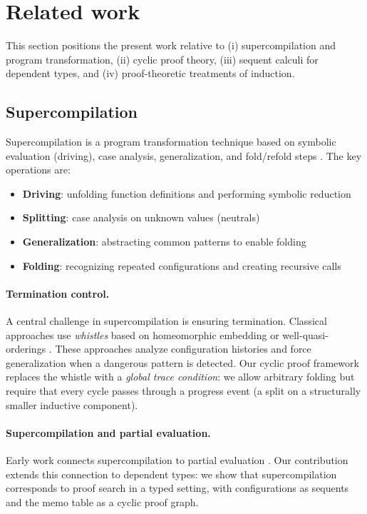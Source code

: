 \section{Related work}
\label{sec:related}

This section positions the present work relative to (i) supercompilation and program transformation, (ii) cyclic proof theory, (iii) sequent calculi for dependent types, and (iv) proof-theoretic treatments of induction.

\subsection{Supercompilation}

Supercompilation is a program transformation technique based on symbolic evaluation (driving), case analysis, generalization, and fold/refold steps \cite{turchin-1986-supercompiler,sorensen-gluck-1995-supercompilation}.
The key operations are:
\begin{itemize}
\item \textbf{Driving}: unfolding function definitions and performing symbolic reduction
\item \textbf{Splitting}: case analysis on unknown values (neutrals)
\item \textbf{Generalization}: abstracting common patterns to enable folding
\item \textbf{Folding}: recognizing repeated configurations and creating recursive calls
\end{itemize}

\paragraph{Termination control.}
A central challenge in supercompilation is ensuring termination. 
Classical approaches use \emph{whistles} based on homeomorphic embedding or well-quasi-orderings \cite{kruskal-1960-wqo,leuschel-2002-homeomorphic,sorensen-gluck-jones-1996-positive}.
These approaches analyze configuration histories and force generalization when a dangerous pattern is detected.
Our cyclic proof framework replaces the whistle with a \emph{global trace condition}: we allow arbitrary folding but require that every cycle passes through a progress event (a split on a structurally smaller inductive component).

\paragraph{Supercompilation and partial evaluation.}
Early work connects supercompilation to partial evaluation \cite{jonesbook-1996-partial-evaluation}.
Our contribution extends this connection to dependent types: we show that supercompilation corresponds to proof search in a typed setting, with configurations as sequents and the memo table as a cyclic proof graph.

